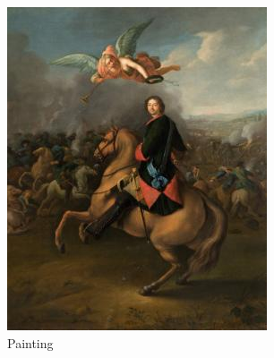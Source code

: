 \begin{figure}[H]
\begin{subfigure}[t]{0.3\textwidth}
        \includegraphics[width=\linewidth]{imagenes/dataset_examples/painting.jpg}
        \caption*{Painting}
    \end{subfigure}
    \begin{subfigure}[t]{0.3\textwidth}
        \centering

\end{subfigure}
\end{figure}

